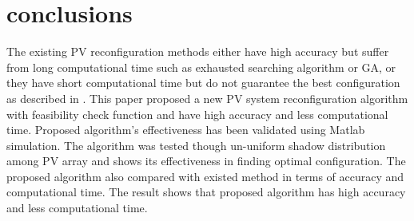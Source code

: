 \documentclass[conference]{IEEEtran}
\begin{document}
\section{conclusions}
The existing PV reconfiguration methods either have high accuracy but suffer from long computational time such as exhausted searching algorithm or GA, or they have short computational time but do not guarantee the best configuration as described in \cite{b10} \cite{b11} \cite{b12}. This paper proposed a new PV system reconfiguration algorithm with feasibility check function and have high accuracy and less computational time. Proposed algorithm's effectiveness has been validated using Matlab simulation. The algorithm was tested though un-uniform shadow distribution among PV array and shows its effectiveness in finding optimal configuration. The proposed algorithm also compared with existed method in terms of accuracy and computational time. The result shows that proposed algorithm has high accuracy and less computational time.
\end{document}

